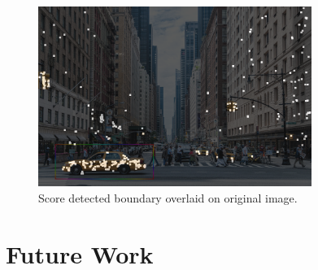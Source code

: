 \documentclass[10pt, journal]{vgtc}                %
\begin{document}
\begin{figure}[h!]
	\centering
	\includegraphics[width=3.5in]{overlay_taxi.png}
	\caption{Score detected boundary overlaid on original image.}
\end{figure}

\section{Future Work}
\end{document}
